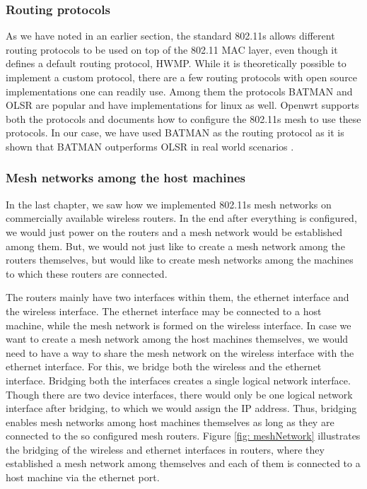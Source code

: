 \subsubsection{Routing protocols}
As we have noted in an earlier section, the standard 802.11s allows different routing protocols to be used on top of the 802.11 MAC layer, even though it defines a default routing protocol, HWMP. While it is theoretically possible to implement a custom protocol, there are a few routing protocols with open source implementations one can readily use. Among them the protocols BATMAN and OLSR are popular and have implementations for linux as well. Openwrt supports both the protocols and documents how to configure the 802.11s mesh to use these protocols. In our case, we have used BATMAN as the routing protocol as it is shown that BATMAN outperforms OLSR in real world scenarios \cite{batcom}.

\subsubsection{Mesh networks among the host machines}
In the last chapter, we saw how we implemented 802.11s mesh networks on commercially available wireless routers. In the end after everything is configured, we would just power on the routers and a mesh network would be established among them. But, we would not just like to create a mesh network among the routers themselves, but would like to create mesh networks among the machines to which these routers are connected.

The routers mainly have two interfaces within them, the ethernet interface and the wireless interface. The ethernet interface may be connected to a host machine, while the mesh network is formed on the wireless interface. In case we want to create a mesh network among the host machines themselves, we would need to have a way to share the mesh network on the wireless interface with the ethernet interface. For this, we bridge both the wireless and the ethernet interface. Bridging both the interfaces creates a single logical network interface. Though there are two device interfaces, there would only be one logical network interface after bridging, to which we would assign the IP address. Thus, bridging enables mesh networks among host machines themselves as long as they are connected to the so configured mesh routers. Figure \ref{fig: meshNetwork} illustrates the bridging of the wireless and ethernet interfaces in routers, where they established a mesh network among themselves and each of them is connected to a host machine via the ethernet port.

